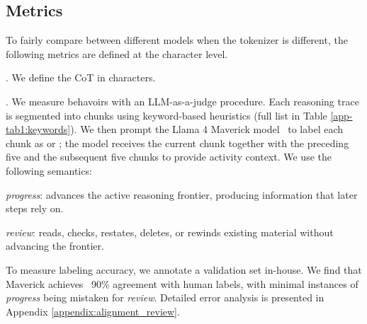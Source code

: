 \subsection{Metrics}

To fairly compare between different models when the tokenizer is different, the following metrics are defined at the character level. 

\Length. We define the CoT \Length in characters.

\Review. We measure \Review behavoirs with an LLM-as-a-judge procedure. Each reasoning trace is segmented into chunks using keyword-based heuristics (full list in Table \ref{app-tab1:keywords}). We then prompt the Llama 4 Maverick model~\citep{meta2025llama} to label each chunk as \progress or \review; the model receives the current chunk together with the preceding five and the subsequent five chunks to provide activity context. We use the following semantics:


\begin{description}
\item \textit{progress}: advances the active reasoning frontier, producing information that later steps rely on.
\item \textit{review}: reads, checks, restates, deletes, or rewinds existing material without advancing the frontier.
\end{description}



To measure labeling accuracy, we annotate a validation set in-house. We find that Maverick achieves ~90\% agreement with human labels, with minimal instances of {\textit{progress}} being mistaken for {\textit{review}}. Detailed error analysis is presented in Appendix \ref{appendix:alignment_review}.

